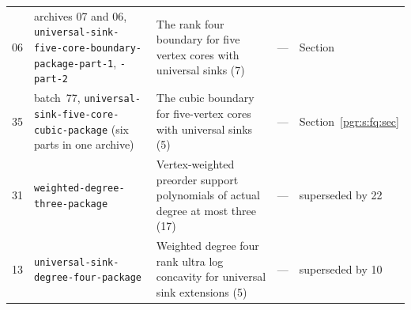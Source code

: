 \documentclass[11pt]{article}
\makeatletter
\numberwithin{equation}{section}
\theoremstyle{definition}\newtheorem{definition}[theorem]{Definition}\newtheorem{remark}[theorem]{Remark}
\newcommand{\pgrfwd}[2]{\@ifundefined{r@#1}{#2}{\ref{#1}}}
\makeatother
\begin{document}
\begin{center}
\begin{longtable}{p{9mm}p{40mm}p{52mm}p{13mm}p{20mm}}
06 & archives 07 and 06, \nolinkurl{universal-sink-five-core-boundary-package-part-1}, \texttt{-part-2} & The rank four boundary for five vertex cores with universal sinks (7) & --- & Section~\pgrfwd{pgr:s:fb:sec}{in Part~III}\\
35 & batch~77, \nolinkurl{universal-sink-five-core-cubic-package} (six parts in one archive) & The cubic boundary for five-vertex cores with universal sinks (5) & --- & Section~\ref{pgr:s:fq:sec}\\
31 & \nolinkurl{weighted-degree-three-package} & Vertex-weighted preorder support polynomials of actual degree at most three (17) & --- & superseded by 22\\
13 & \nolinkurl{universal-sink-degree-four-package} & Weighted degree four rank ultra log concavity for universal sink extensions (5) & --- & superseded by 10\\\bottomrule
\end{longtable}
\end{center}
\end{document}
